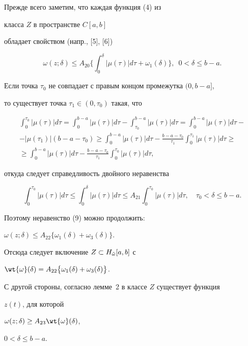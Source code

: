 \begin{pf}


Прежде всего заметим, что каждая функция (4) из


класса $Z$ в пространстве $C[a,b]$


обладает свойством (напр., [5], [6])


\begin{equation}


\omega(z;\delta)\leq A_{20}\bigg\{ \int_0^\delta |\mu(\tau)| d\tau


+\omega_1(\delta)\bigg\},\ \; 0<\delta \leq b-a.


\end{equation}


Если точка $\tau_0$ не совпадает с правым концом промежутка $(0,b-a]$,


то существует точка $\tau_1\in (0,\tau_0)$ такая, что


\begin{multline*}


\int_0^{\tau_0}|\mu(\tau)| d\tau =\int_0^{b-a}|\mu(\tau)| 


d\tau - \int_{\tau_0}^{b-a}|\mu(\tau)| d\tau =


\int_0^{b-a}|\mu(\tau)| d\tau - \\


%


-|\mu(\tau_1)|(b-a-\tau_0)\geq \int_0^{b-a}|\mu(\tau)| d\tau


- \frac{b-a-\tau_0}{\tau_1}\int_0^{\tau_1}|\mu(\tau)| d\tau \geq \\


%


\geq \int_0^{b-a}|\mu(\tau)| d\tau


- \frac{b-a-\tau_0}{\tau_1}\int_0^{\tau_0}|\mu(\tau)| d\tau ,


\end{multline*}


откуда следует справедливость двойного неравенства


$$


\int_0^{\tau_0}|\mu(\tau)| d\tau \leq \int_0^{\delta}


|\mu(\tau)| d\tau \leq A_{21}\int_{0}^{\tau_0}|\mu(\tau)| d\tau ,


\quad \tau_0 <\delta\leq b-a.


$$


Поэтому неравенство (9) можно продолжить:


$\omega(z;\delta)\leq A_{22} \{ \omega_1(\delta)+\omega_3(\delta)\}$.


Отсюда следует включение $Z\subset H_{\Tilde{\omega}}[a,b]$ с


$\wt{\omega}(\delta)=A_{22} \bigl\{ \omega_1(\delta)+


\omega_3(\delta)\bigr\}$.





С другой стороны, согласно лемме~2 в классе $Z$ существует функция


$z(t)$, для которой


$\omega(z;\delta)\geq A_{23} \wt{\omega}(\delta)$,


$0<\delta\leq b-a$.


\end{pf}
